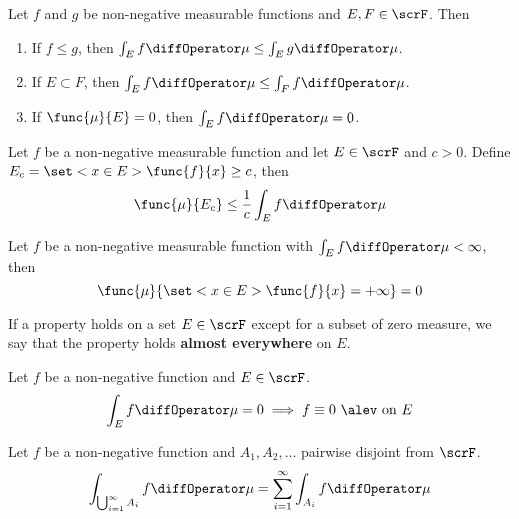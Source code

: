 \begin{proposition}
    Let \(f\) and \(g\) be non-negative measurable functions and \(E,F \in \scrF\). Then 
    \begin{enumerate}
        \item If \(f \leq g\), then \(\int_E f \diffOperator \mu \leq \int_E g \diffOperator \mu \).
        \item If \(E \subset F\), then \(\int_E f \diffOperator \mu \leq \int_F f \diffOperator \mu \).
        \item If \(\func{\mu}{E} = 0\), then \(\int_E f \diffOperator \mu = 0\).
    \end{enumerate}
\end{proposition}

\begin{theorem}[Chebyshev]
    Let \(f\) be a non-negative measurable function and let \(E \in \scrF\) and \(c > 0\). Define \(E_c = \set<x \in E>{\func{f}{x} \geq c}\), then 
    \begin{equation*}
        \func{\mu}{E_c} \leq \dfrac{1}{c} \int_{E} f \diffOperator \mu 
    \end{equation*}
\end{theorem}

\begin{corollary}
    Let \(f\) be a non-negative measurable function with \(\int_E f \diffOperator \mu < \infty\), then
    \begin{equation*} 
        \func{\mu}{\set<x\in E>{\func{f}{x} = + \infty}} = 0
    \end{equation*}
\end{corollary}

\begin{definition}
    If a property holds on a set \(E \in \scrF\) except for a subset of zero measure, we say that the property holds \textbf{almost everywhere} on \(E\).
\end{definition}

\begin{corollary}
    Let \(f\) be a non-negative function and \(E \in \scrF\). 
    \begin{equation*}
        \int_E f \diffOperator \mu = 0 \implies f \equiv 0 \mathrm{\ \alev \ on \ } E
    \end{equation*}
\end{corollary}

\begin{theorem}
    Let \(f\) be a non-negative function and \(A_1, A_2, \dots \) pairwise disjoint from \(\scrF\). 
    \begin{equation*}
        \int_{\bigcup_{i = 1}^{\infty} A_i} f \diffOperator \mu = \sum_{i= 1}^{\infty} \int_{A_i} f \diffOperator \mu 
    \end{equation*}
\end{theorem}

